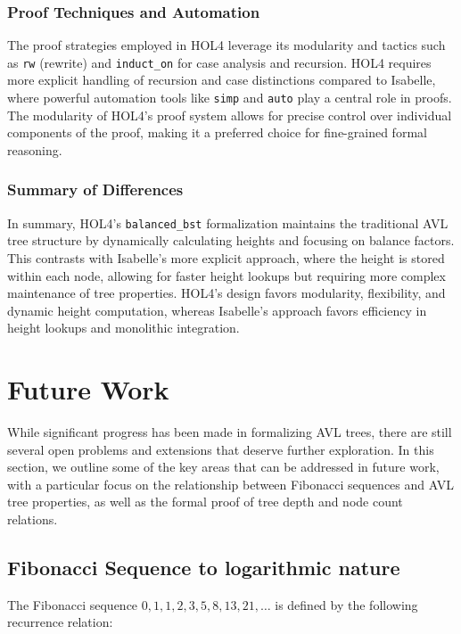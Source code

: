 \documentclass[12pt]{article}
\begin{document}
\begin{itemize}
\subsubsection{Proof Techniques and Automation}
The proof strategies employed in HOL4 leverage its modularity and tactics such as \texttt{rw} (rewrite) and \texttt{induct\_on} for case analysis and recursion. HOL4 requires more explicit handling of recursion and case distinctions compared to Isabelle, where powerful automation tools like \texttt{simp} and \texttt{auto} play a central role in proofs. The modularity of HOL4’s proof system allows for precise control over individual components of the proof, making it a preferred choice for fine-grained formal reasoning.

\subsubsection{Summary of Differences}
In summary, HOL4’s \texttt{balanced\_bst} formalization maintains the traditional AVL tree structure by dynamically calculating heights and focusing on balance factors. This contrasts with Isabelle’s more explicit approach, where the height is stored within each node, allowing for faster height lookups but requiring more complex maintenance of tree properties. HOL4’s design favors modularity, flexibility, and dynamic height computation, whereas Isabelle’s approach favors efficiency in height lookups and monolithic integration.

\section*{Future Work}

While significant progress has been made in formalizing AVL trees, there are still several open problems and extensions that deserve further exploration. In this section, we outline some of the key areas that can be addressed in future work, with a particular focus on the relationship between Fibonacci sequences and AVL tree properties, as well as the formal proof of tree depth and node count relations.

\subsection*{Fibonacci Sequence to logarithmic nature}

The Fibonacci sequence \( 0, 1, 1, 2, 3, 5, 8, 13, 21, \dots \) is defined by the following recurrence relation:


\end{itemize}
\end{document}
